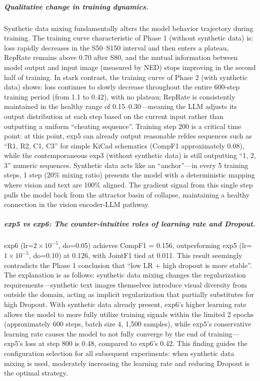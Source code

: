 \subparagraph{Qualitative change in training dynamics.}
Synthetic data mixing fundamentally alters the model behavior trajectory during training. The training curve characteristic of Phase 1 (without synthetic data) is: loss rapidly decreases in the S50--S150 interval and then enters a plateau, RepRate remains above 0.70 after S80, and the mutual information between model output and input image (measured by NED) stops improving in the second half of training. In stark contrast, the training curve of Phase 2 (with synthetic data) shows: loss continues to slowly decrease throughout the entire 600-step training period (from 1.1 to 0.42), with no plateau; RepRate is consistently maintained in the healthy range of 0.15--0.30---meaning the LLM adjusts its output distribution at each step based on the current input rather than outputting a uniform ``cheating sequence''. Training step 200 is a critical time point: at this point, exp5 can already output reasonable refdes sequences such as ``R1, R2, C1, C3'' for simple KiCad schematics (CompF1 approximately 0.08), while the contemporaneous exp3 (without synthetic data) is still outputting ``1, 2, 3'' numeric sequences. Synthetic data acts like an ``anchor''---in every 5 training steps, 1 step (20\% mixing ratio) presents the model with a deterministic mapping where vision and text are 100\% aligned. The gradient signal from this single step pulls the model back from the attractor basin of collapse, maintaining a healthy connection in the vision encoder-LLM pathway.

\subparagraph{exp5 vs exp6: The counter-intuitive roles of learning rate and Dropout.}
exp6 (lr=$2\times10^{-5}$, do=0.05) achieves CompF1 = 0.156, outperforming exp5 (lr=$1\times10^{-5}$, do=0.10) at 0.126, with JointF1 tied at 0.011. This result seemingly contradicts the Phase 1 conclusion that ``low LR + high dropout is more stable''. The explanation is as follows: synthetic data mixing changes the regularization requirements---synthetic text images themselves introduce visual diversity from outside the domain, acting as implicit regularization that partially substitutes for high Dropout. With synthetic data already present, exp6's higher learning rate allows the model to more fully utilize training signals within the limited 2 epochs (approximately 600 steps, batch size 4, 1,500 samples), while exp5's conservative learning rate causes the model to not fully converge by the end of training---exp5's loss at step 800 is 0.48, compared to exp6's 0.42. This finding guides the configuration selection for all subsequent experiments: when synthetic data mixing is used, moderately increasing the learning rate and reducing Dropout is the optimal strategy.

